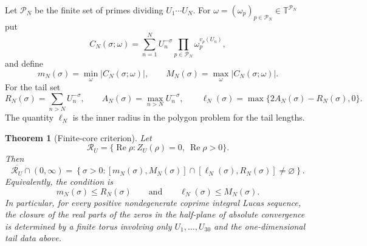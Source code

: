 \documentclass[11pt]{article}
\newtheorem{theorem}{Theorem}[section]
\theoremstyle{remark}
\newcommand{\T}{\mathbb T}
\newcommand{\Ree}{\operatorname{Re}}
\begin{document}
Let $\mathcal P_N$ be the finite set of primes dividing $U_1\cdots U_N$.  For $\omega=(\omega_p)_{p\in\mathcal P_N}\in\T^{\mathcal P_N}$ put
\begin{equation}\label{eq:lucas-core}
C_N(\sigma;\omega)
=\sum_{n=1}^{N}U_n^{-\sigma}
 \prod_{p\in\mathcal P_N}\omega_p^{v_p(U_n)},
\end{equation}
and define
\[
m_N(\sigma)=\min_{\omega}|C_N(\sigma;\omega)|,
\qquad
M_N(\sigma)=\max_{\omega}|C_N(\sigma;\omega)|.
\]
For the tail set
\[
R_N(\sigma)=\sum_{n>N}U_n^{-\sigma},
\qquad
A_N(\sigma)=\max_{n>N}U_n^{-\sigma},
\qquad
\ell_N(\sigma)=\max\{2A_N(\sigma)-R_N(\sigma),0\}.
\]
The quantity $\ell_N$ is the inner radius in the polygon problem for the tail lengths.

\begin{theorem}[Finite-core criterion]\label{thm:lucas-core}
Let
\[
\mathcal R_U=\{\Ree\rho:Z_U(\rho)=0,\ \Ree\rho>0\}.
\]
Then
\begin{equation}\label{eq:lucas-core-criterion}
\overline{\mathcal R_U}\cap(0,\infty)
=
\left\{\sigma>0:
[m_N(\sigma),M_N(\sigma)]
\cap
[\ell_N(\sigma),R_N(\sigma)]\ne\varnothing
\right\}.
\end{equation}
Equivalently, the condition is
\[
m_N(\sigma)\le R_N(\sigma)
\qquad\text{and}\qquad
\ell_N(\sigma)\le M_N(\sigma).
\]
In particular, for every positive nondegenerate coprime integral Lucas sequence, the closure of the real parts of the zeros in the half-plane of absolute convergence is determined by a finite torus involving only $U_1,\ldots,U_{30}$ and the one-dimensional tail data above.
\end{theorem}
\end{document}
